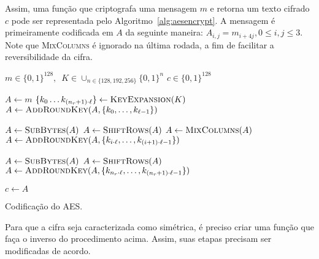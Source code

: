 \documentclass{ufsctex/ufsctex}
\newcommand{\binwds}[1]{\{0, 1\}^{#1}}
\begin{document}
Assim, uma função que criptografa uma mensagem $m$ e retorna um texto cifrado
$c$ pode ser representada pelo Algoritmo~\ref{alg:aesencrypt}. A mensagem é
primeiramente codificada em $A$ da seguinte maneira: $A_{i, j} = m_{i + 4j}, 0
\leq i, j \leq 3$. Note que \textsc{MixColumns} é ignorado na última rodada, a
fim de facilitar a reversibilidade da cifra.

\begin{algorithm}
  \begin{algorithmic}
    \REQUIRE{}  $m \in \binwds{128}, \enspace
      K \in \cup_{n \in \{128, 192, 256\}} \binwds{n}$
    \ENSURE{}  $c \in \binwds{128}$ 

    \STATE{}  $A \leftarrow m$
    \STATE{}  $\{k_{0} \dots k_{(n_{r} + 1) \cdot \ell}\}
      \leftarrow \textsc{KeyExpansion}(K)$
    \STATE{}  $A \leftarrow \textsc{AddRoundKey}(A,
      \{k_{0}, \dots, k_{\ell - 1}\})$

      \STATE{}  $A \leftarrow \textsc{SubBytes}(A)$
      \STATE{}  $A \leftarrow \textsc{ShiftRows}(A)$
      \STATE{}  $A \leftarrow \textsc{MixColumns}(A)$
      \STATE{}  $A \leftarrow \textsc{AddRoundKey}(A,
        \{k_{i \cdot \ell}, \dots, k_{(i + 1) \cdot \ell - 1}\})$
    \ENDFOR{}

    \STATE{}  $A \leftarrow \textsc{SubBytes}(A)$
    \STATE{}  $A \leftarrow \textsc{ShiftRows}(A)$
    \STATE{}  $A \leftarrow \textsc{AddRoundKey}(A,
      \{k_{n_{r} \cdot \ell}, \dots, k_{(n_{r} + 1) \cdot \ell - 1}\})$

    \STATE{}  $c \leftarrow A$
  \end{algorithmic}
  \caption{Codificação do AES.}\label{alg:aesencrypt}
\end{algorithm}

Para que a cifra seja caracterizada como simétrica, é preciso criar uma função
que faça o inverso do procedimento acima. Assim, suas etapas precisam ser
modificadas de acordo.
\end{document}

